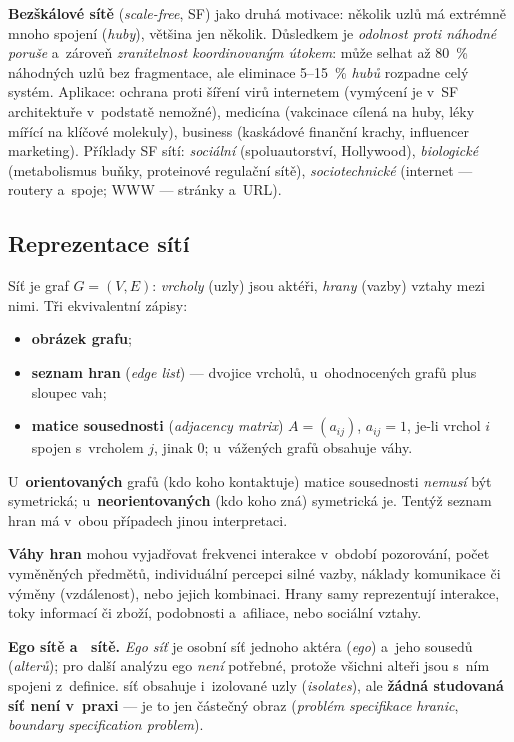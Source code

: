 \documentclass[11pt,a4paper]{article}
\theoremstyle{definition}
\begin{document}
\textbf{Bezškálové sítě} (\emph{scale-free}, SF) jako druhá motivace: několik uzlů má extrémně
mnoho spojení (\emph{huby}), většina jen několik. Důsledkem je \emph{odolnost proti náhodné
poruše} a~zároveň \emph{zranitelnost koordinovaným útokem}: může selhat až 80~\% náhodných uzlů
bez fragmentace, ale eliminace 5--15~\% \emph{hubů} rozpadne celý systém. Aplikace: ochrana
proti šíření virů internetem (vymýcení je v~SF architektuře v~podstatě nemožné), medicína
(vakcinace cílená na huby, léky mířící na klíčové molekuly), business (kaskádové finanční
krachy, influencer marketing). Příklady SF sítí: \emph{sociální} (spoluautorství, Hollywood),
\emph{biologické} (metabolismus buňky, proteinové regulační sítě), \emph{sociotechnické}
(internet --- routery a~spoje; WWW --- stránky a~URL).

\subsection{Reprezentace sítí}

\begin{defbox}
Síť je graf $G=(V,E)$: \emph{vrcholy} (uzly) jsou aktéři, \emph{hrany} (vazby) vztahy mezi
nimi. Tři ekvivalentní zápisy:
\begin{itemize}
\item \textbf{obrázek grafu};
\item \textbf{seznam hran} (\emph{edge list}) --- dvojice vrcholů, u~ohodnocených grafů plus
      sloupec vah;
\item \textbf{matice sousednosti} (\emph{adjacency matrix}) $A=(a_{ij})$, $a_{ij}=1$, je-li
      vrchol $i$ spojen s~vrcholem $j$, jinak 0; u~vážených grafů obsahuje váhy.
\end{itemize}
U~\textbf{orientovaných} grafů (kdo koho kontaktuje) matice sousednosti \emph{nemusí} být
symetrická; u~\textbf{neorientovaných} (kdo koho zná) symetrická je. Tentýž seznam hran má
v~obou případech jinou interpretaci.
\end{defbox}

\textbf{Váhy hran} mohou vyjadřovat frekvenci interakce v~období pozorování, počet vyměněných
předmětů, individuální percepci silné vazby, náklady komunikace či výměny (vzdálenost), nebo
jejich kombinaci. Hrany samy reprezentují interakce, toky informací či zboží, podobnosti
a~afiliace, nebo sociální vztahy.

\textbf{Ego sítě a~ sítě.} \emph{Ego síť} je osobní síť jednoho aktéra (\emph{ego})
a~jeho sousedů (\emph{alterů}); pro další analýzu ego \emph{není} potřebné, protože všichni
alteři jsou s~ním spojeni z~definice.  síť obsahuje i~izolované uzly
(\emph{isolates}), ale \textbf{žádná studovaná síť není v~praxi } --- je to jen
částečný obraz (\emph{problém specifikace hranic}, \emph{boundary specification problem}).
\end{document}
